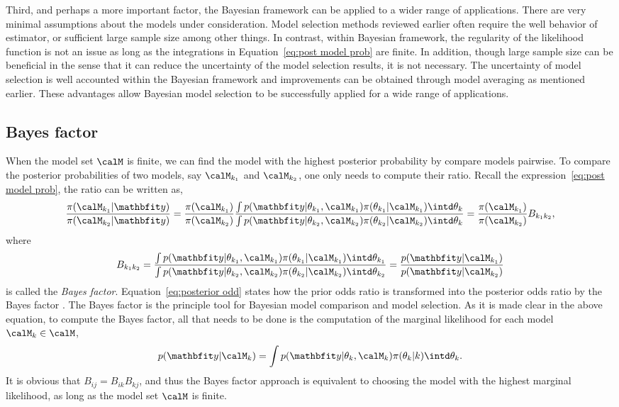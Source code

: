 Third, and perhaps a more important factor, the Bayesian framework can be
applied to a wider range of applications. There are very minimal assumptions
about the models under consideration. Model selection methods reviewed earlier
often require the well behavior of estimator, or sufficient large sample size
among other things. In contrast, within Bayesian framework, the regularity of
the likelihood function is not an issue as long as the integrations in
Equation~\eqref{eq:post model prob} are finite. In addition, though large
sample size can be beneficial in the sense that it can reduce the uncertainty
of the model selection results, it is not necessary. The uncertainty of model
selection is well accounted within the Bayesian framework and improvements can
be obtained through model averaging as mentioned earlier. These advantages
allow Bayesian model selection to be successfully applied for a wide range of
applications.

\subsection{Bayes factor}
\label{sub:Bayes factor}

When the model set $\calM$ is finite, we can find the model with the highest
posterior probability by compare models pairwise. To compare the posterior
probabilities of two models, say $\calM_{k_1}$ and $\calM_{k_2}$, one only
needs to compute their ratio. Recall the expression~\eqref{eq:post model prob},
the ratio can be written as,
\begin{equation}
  \frac{\pi(\calM_{k_1}|\data)}{\pi(\calM_{k_2}|\data)}
  = \frac{\pi(\calM_{k_1})}{\pi(\calM_{k_2})} \frac
  {\int p(\data|\theta_{k_1},\calM_{k_1})\pi(\theta_{k_1}|\calM_{k_1})
      \intd\theta_k}
  {\int p(\data|\theta_{k_2},\calM_{k_2})\pi(\theta_{k_2}|\calM_{k_2})
      \intd\theta_k}
  = \frac{\pi(\calM_{k_1})}{\pi(\calM_{k_2})}B_{k_1k_2},
  \label{eq:posterior odd}
\end{equation}
where
\begin{equation}
  B_{k_1k_2} = \frac
  {\int p(\data|\theta_{k_1},\calM_{k_1})\pi(\theta_{k_1}|\calM_{k_1})
      \intd\theta_{k_1}}
  {\int p(\data|\theta_{k_2},\calM_{k_2})\pi(\theta_{k_2}|\calM_{k_2})
      \intd\theta_{k_2}}
    = \frac{p(\data|\calM_{k_1})}{p(\data|\calM_{k_2})}
  \label{eq:bayes factor}
\end{equation}
is called the \emph{Bayes factor}. Equation~\eqref{eq:posterior odd} states
how the prior odds ratio is transformed into the posterior odds ratio by the
Bayes factor \cite{Kass:1995vb}. The Bayes factor is the principle tool for
Bayesian model comparison and model selection. As it is made clear in the
above equation, to compute the Bayes factor, all that needs to be done is the
computation of the marginal likelihood for each model $\calM_k\in\calM$,
\begin{equation}
  p(\data|\calM_k) =
  \int p(\data|\theta_k,\calM_k)\pi(\theta_k|k)\intd\theta_k.
\end{equation}
It is obvious that $B_{ij} = B_{ik}B_{kj}$, and thus the Bayes
factor approach is equivalent to choosing the model with the highest marginal
likelihood, as long as the model set $\calM$ is finite.


